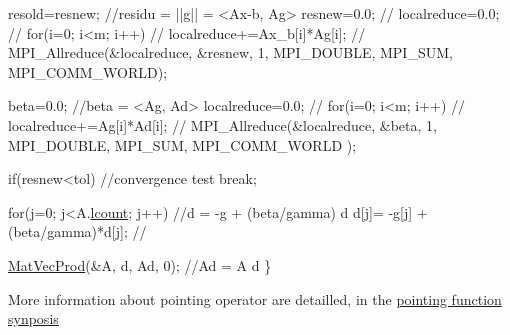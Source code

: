 \begin{DoxyCode}
      resold=resnew;                      \textcolor{comment}{//residu = ||g|| = <Ax-b, Ag>}
      resnew=0.0;                         \textcolor{comment}{//}
      localreduce=0.0;                    \textcolor{comment}{//}
      \textcolor{keywordflow}{for}(i=0; i<m; i++)                  \textcolor{comment}{//         }
        localreduce+=Ax\_b[i]*Ag[i];       \textcolor{comment}{//}
      MPI\_Allreduce(&localreduce, &resnew, 1, MPI\_DOUBLE, MPI\_SUM, 
      MPI\_COMM\_WORLD);
   
      beta=0.0;                           \textcolor{comment}{//beta = <Ag, Ad>}
      localreduce=0.0;                    \textcolor{comment}{//}
      \textcolor{keywordflow}{for}(i=0; i<m; i++)                  \textcolor{comment}{//         }
        localreduce+=Ag[i]*Ad[i];         \textcolor{comment}{//}
      MPI\_Allreduce(&localreduce, &beta, 1, MPI\_DOUBLE, MPI\_SUM, MPI\_COMM\_WORLD
      );
   
      \textcolor{keywordflow}{if}(resnew<tol)                       \textcolor{comment}{//convergence test}
         \textcolor{keywordflow}{break};
       
      \textcolor{keywordflow}{for}(j=0; j<A.\hyperlink{structMat_a983857e6f4ddb2c19a5119bcf1b6af63}{lcount}; j++)           \textcolor{comment}{//d = -g + (beta/gamma) d}
        d[j]= -g[j] + (beta/gamma)*d[j];  \textcolor{comment}{// }
   
      \hyperlink{group__matmap__group12a_gaf757d9249d31d2839b3376ac2e3f5574}{MatVecProd}(&A, d, Ad, 0);           \textcolor{comment}{//Ad = A d}
    \}
\end{DoxyCode}


More information about pointing operator are detailled, in the \hyperlink{mapmat_8c}{pointing function synposis }

\par
 